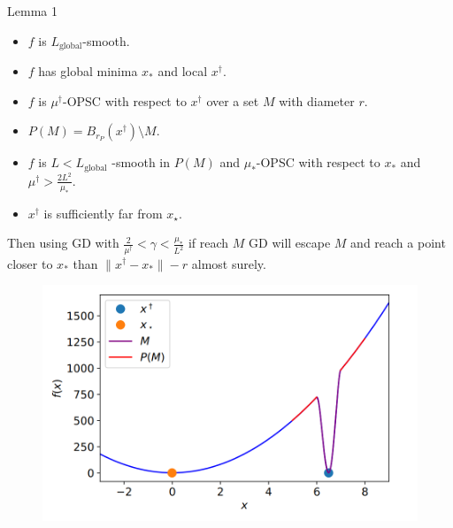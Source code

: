 \documentclass{beamer}
\begin{document}
\begin{frame}{Lemma 1}

\begin{itemize}
	\item $f$ is $L_{\text{global}}$-smooth.
	\item $f$ has global minima $x_\ast$ and local $x^\dagger$.
	\item $f$ is $\mu^{\dagger}$-OPSC with respect to  $x^\dagger$ over a set $M$ with diameter $r$.
	\item $P(M) = B_{r_P}(x^\dagger) \setminus M$. 
	\item $f$ is $L < L_{\mathrm{global}}$ -smooth in $P(M)$ and $\mu_\ast$-OPSC with respect to $x_\ast$ and $\mu^\dagger > \frac{2L^2}{\mu_\ast}$.
	\item $x^\dagger$ is sufficiently far from $x_\star$.

\end{itemize}
Then using GD with $\frac{2}{\mu^{\dagger}} < \gamma < \frac{\mu_\ast}{L^2}$ if reach $M$
GD will escape $M$ and reach a point closer to $x_\ast$ than 
$\| x^\dagger - x_\ast\| - r$ almost surely.
	\begin{figure}[h]
	     \includegraphics[scale=0.2]{lemma1}
	\end{figure}

\end{frame}
\end{document}

